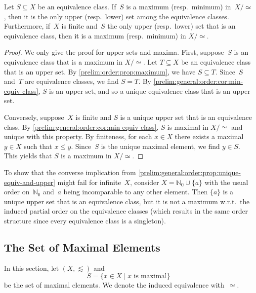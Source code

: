 \begin{proposition}\label{prelim:general:order:prop:unique-equiv-and-upper}
	Let $S \subseteq X$ be an equivalence class.
	If~$S$ is a maximum (resp.~minimum) in~$X / {\simeq}$,
	then it is the only upper (resp.~lower) set among the equivalence classes.
	Furthermore, if~$X$ is finite and~$S$ the only upper (resp.~lower) set that is an equivalence
	class, then it is a maximum (resp.~minimum) in $X / {\simeq}$.
\end{proposition}
\begin{proof}
	We only give the proof for upper sets and maxima.
	First, suppose~$S$ is an equivalence class that is a maximum in $X / {\simeq}$.
	Let $T \subseteq X$ be an equivalence class that is an upper set.
	By \cref{prelim:order:prop:maximum}, we have $S \subseteq T$.
	Since~$S$ and~$T$ are equivalence classes,
	we find $S = T$.
	By \cref{prelim:general:order:cor:min-equiv-class}, $S$ is
	an upper set, and so a unique equivalence class
	that is an upper set.
	
	Conversely, suppose~$X$ is finite and $S$ is 
	a unique upper set that is an equivalence class.
	By \cref{prelim:general:order:cor:min-equiv-class}, $S$
	is maximal in $X / {\simeq}$ and unique with this property.
	By finiteness, for each $x \in X$
	there exists a maximal $y \in X$ such that $x \le y$.
	Since~$S$ is the unique maximal element,
	we find $y \in S$.
	This yields that $S$ is a maximum in $X / {\simeq}$.	
\end{proof}

To show that the converse implication
from \cref{prelim:general:order:prop:unique-equiv-and-upper}
might fail for infinite~$X$, consider $X = \mathbb N_0 \cup \{ a \}$
with the usual order on~$\mathbb N_0$
and~$a$ being incomparable to any other element.
Then $\{a\}$ is a unique upper set that is an equivalence class, but it is not a maximum
w.r.t.~the induced partial order on the equivalence classes (which results in the same order structure
since every equivalence class is a singleton).


\subsection{The Set of Maximal Elements}
\label{prelim:gen:order:sec:set-maximal}

In this section, let $(X, \lesssim)$ and
\[
S = \{ x \in X \mid \text{$x$ is maximal}\}
\]
be the set of maximal elements. We denote the induced equivalence with~$\simeq$.


